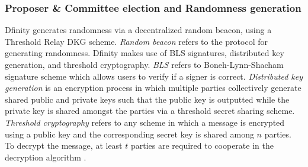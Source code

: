 \documentclass[10pt,journal,compsoc]{IEEEtran}
\begin{document}
\subsubsection{Proposer \& Committee election and Randomness generation}
Dfinity generates randomness via a decentralized random beacon, using a Threshold Relay DKG scheme. \emph{Random beacon} refers to the protocol for generating randomness. Dfinity makes use of BLS signatures, distributed key generation, and threshold cryptography. \emph{BLS} refers to Boneh-Lynn-Shacham signature scheme which allows users to verify if a signer is correct\cite{BonehEtAl}. \emph{Distributed key generation} is an encryption process in which multiple parties collectively generate shared public and private keys such that the public key is outputted while the private key is shared amongst the parties via a threshold secret sharing scheme\cite{Mahnush}. \emph{Threshold cryptography} refers to any scheme in which a message is encrypted using a public key and the corresponding secret key is shared among $n$ parties. To decrypt the message, at least $t$ parties are required to cooperate in the decryption algorithm \cite{Mahnush}.
\end{document}
